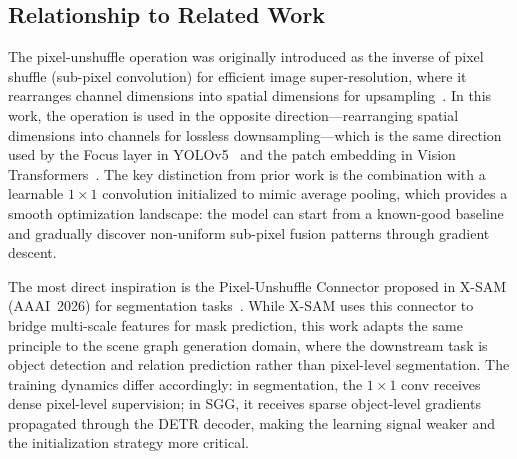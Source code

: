 \subsection{Relationship to Related Work}

The pixel-unshuffle operation was originally introduced as the inverse of pixel shuffle (sub-pixel convolution) for efficient image super-resolution, where it rearranges channel dimensions into spatial dimensions for upsampling~\cite{shi2016real}. In this work, the operation is used in the opposite direction---rearranging spatial dimensions into channels for lossless downsampling---which is the same direction used by the Focus layer in YOLOv5~\cite{ultralytics2020yolov5} and the patch embedding in Vision Transformers~\cite{dosovitskiy2021image}. The key distinction from prior work is the combination with a learnable $1\times1$ convolution initialized to mimic average pooling, which provides a smooth optimization landscape: the model can start from a known-good baseline and gradually discover non-uniform sub-pixel fusion patterns through gradient descent.

The most direct inspiration is the Pixel-Unshuffle Connector proposed in X-SAM (AAAI~2026) for segmentation tasks~\cite{xsam2026}. While X-SAM uses this connector to bridge multi-scale features for mask prediction, this work adapts the same principle to the scene graph generation domain, where the downstream task is object detection and relation prediction rather than pixel-level segmentation. The training dynamics differ accordingly: in segmentation, the $1\times1$ conv receives dense pixel-level supervision; in SGG, it receives sparse object-level gradients propagated through the DETR decoder, making the learning signal weaker and the initialization strategy more critical.
